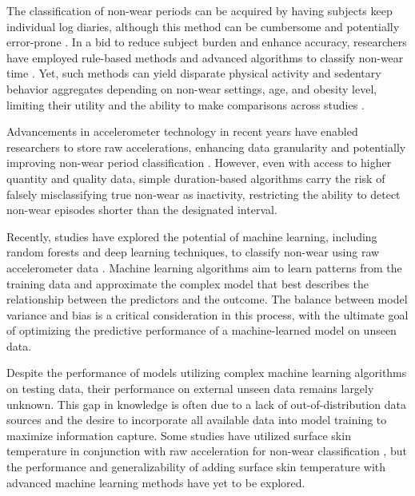 \documentclass[
  10pt,
  letterpaper,
  DIV=11,
  numbers=noendperiod]{scrartcl}
\begin{document}
The classification of non-wear periods can be acquired by having
subjects keep individual log diaries, although this method can be
cumbersome and potentially error-prone
\autocite{ainsworth_recommendations_2012}. In a bid to reduce subject
burden and enhance accuracy, researchers have employed rule-based
methods and advanced algorithms to classify non-wear time
\autocite{hecht_methodology_2009,ruiz_objectively_2011,troiano_physical_2008}.
Yet, such methods can yield disparate physical activity and sedentary
behavior aggregates depending on non-wear settings, age, and obesity
level, limiting their utility and the ability to make comparisons across
studies \autocite{aadland_comparison_2018,toftager_accelerometer_2013}.

Advancements in accelerometer technology in recent years have enabled
researchers to store raw accelerations, enhancing data granularity and
potentially improving non-wear period classification
\autocite{duncan_wear-time_2018,rasmussen_short-term_2020,zhou_classification_2015}.
However, even with access to higher quantity and quality data, simple
duration-based algorithms carry the risk of falsely misclassifying true
non-wear as inactivity, restricting the ability to detect non-wear
episodes shorter than the designated interval.

Recently, studies have explored the potential of machine learning,
including random forests and deep learning techniques, to classify
non-wear using raw accelerometer data
\autocite[\textcite{syed_novel_2021}]{sundararajan_sleep_2021}. Machine
learning algorithms aim to learn patterns from the training data and
approximate the complex model that best describes the relationship
between the predictors and the outcome. The balance between model
variance and bias is a critical consideration in this process, with the
ultimate goal of optimizing the predictive performance of a
machine-learned model on unseen data.

Despite the performance of models utilizing complex machine learning
algorithms on testing data, their performance on external unseen data
remains largely unknown. This gap in knowledge is often due to a lack of
out-of-distribution data sources and the desire to incorporate all
available data into model training to maximize information capture. Some
studies have utilized surface skin temperature in conjunction with raw
acceleration for non-wear classification
\autocite{duncan_wear-time_2018,zhou_classification_2015}, but the
performance and generalizability of adding surface skin temperature with
advanced machine learning methods have yet to be explored.
\end{document}
